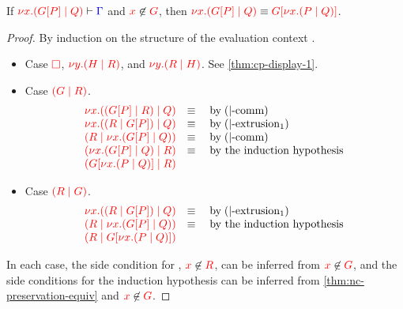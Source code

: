 \begin{lemma}\label{thm:nc-display-1}
  If $\seq[{ \tm{\cpCut{x}{\cpPlug{G}{P}}{Q}} }]{ \Gamma }$ and
  $\notFreeIn{x}{G}$, then $\tm{\cpCut{x}{\cpPlug{G}{P}}{Q}} \equiv
  \tm{\cpPlug{G}{\cpCut{x}{P}{Q}}}$.
\end{lemma}
\begin{proof}
  By induction on the structure of the evaluation context .
  \begin{itemize}
  \item
    Case $\tm{\Box}$, $\tm{\cpCut{y}{H}{R}}$, and $\tm{\cpCut{y}{R}{H}}$. See \cref{thm:cp-display-1}.
  \item
    Case $\tm{\ncPool{G}{R}}$.
    \[\!
      \begin{array}{ll}
        \tm{\cpCut{x}{\ncPool{\cpPlug{G}{P}}{R}}{Q}} & \equiv \quad \text{by} \; \ncEquivPoolComm \\
        \tm{\cpCut{x}{\ncPool{R}{\cpPlug{G}{P}}}{Q}} & \equiv \quad \text{by} \; \ncRedKappaPool1 \\
        \tm{\ncPool{R}{\cpCut{x}{\cpPlug{G}{P}}{Q}}} & \equiv \quad \text{by} \; \ncEquivPoolComm \\
        \tm{\ncPool{\cpCut{x}{\cpPlug{G}{P}}{Q}}{R}} & \equiv \quad \text{by the induction hypothesis}\\
        \tm{\ncPool{\cpPlug{G}{\cpCut{x}{P}{Q}}}{R}} &
      \end{array}
    \]
  \item
    Case $\tm{\ncPool{R}{G}}$.
    \[\!
      \begin{array}{ll}
        \tm{\cpCut{x}{\ncPool{R}{\cpPlug{G}{P}}}{Q}} & \equiv \quad \text{by} \; \ncRedKappaPool1 \\
        \tm{\ncPool{R}{\cpCut{x}{\cpPlug{G}{P}}{Q}}} & \equiv \quad \text{by the induction hypothesis}\\
        \tm{\ncPool{R}{\cpPlug{G}{\cpCut{x}{P}{Q}}}} &
      \end{array}
    \]
  \end{itemize}
  In each case, the side condition for , $\notFreeIn{x}{R}$, can
  be inferred from $\notFreeIn{x}{G}$, and the side conditions for the induction
  hypothesis can be inferred from \cref{thm:nc-preservation-equiv} and
  $\notFreeIn{x}{G}$.
\end{proof}
